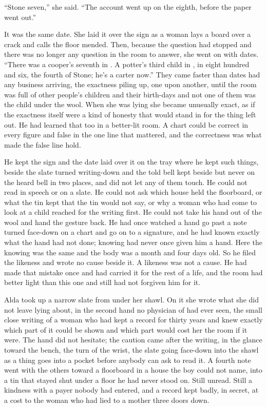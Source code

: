 “Stone seven,” she said. “The account went up on the eighth, before the paper went out.”

It was the same date. She laid it over the sign as a woman lays a board over a crack and calls the floor mended. Then, because the question had stopped and there was no longer any question in the room to answer, she went on with dates. “There was a cooper's seventh in . A potter's third child in , in eight hundred and six, the fourth of Stone; he's a carter now.” They came faster than dates had any business arriving, the exactness piling up, one upon another, until the room was full of other people's children and their birth-days and not one of them was the child under the wool. When she was lying she became unusually exact, as if the exactness itself were a kind of honesty that would stand in for the thing left out. He had learned that too in a better-lit room. A chart could be correct in every figure and false in the one line that mattered, and the correctness was what made the false line hold.

He kept the sign and the date laid over it on the tray where he kept such things, beside the slate turned writing-down and the told bell kept beside but never on the heard bell in two places, and did not let any of them touch. He could not read  in speech or on a slate. He could not ask which house held the floorboard, or what the tin kept that the tin would not say, or why a woman who had come to look at a child reached for the writing first. He could not take his hand out of the wool and hand the gesture back. He had once watched a hand go past a note turned face-down on a chart and go on to a signature, and he had known exactly what the hand had not done; knowing had never once given him a hand. Here the knowing was the same and the body was a month and four days old. So he filed the likeness and wrote no cause beside it. A likeness was not a cause. He had made that mistake once and had carried it for the rest of a life, and the room had better light than this one and still had not forgiven him for it.

\scenebreak

Alda took up a narrow slate from under her shawl. On it she wrote what she did not leave lying about, in the second hand no physician of  had ever seen, the small close writing of a woman who had kept a record for thirty years and knew exactly which part of it could be shown and which part would cost her the room if it were. The hand did not hesitate; the caution came after the writing, in the glance toward the bench, the turn of the wrist, the slate going face-down into the shawl as a thing goes into a pocket before anybody can ask to read it. A fourth note went with the others toward a floorboard in a house the boy could not name, into a tin that stayed shut under a floor he had never stood on. Still unread. Still a kindness with a payer nobody had entered, and a record kept badly, in secret, at a cost to the woman who had lied to a mother three doors down.

